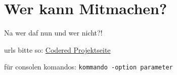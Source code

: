 \chapter{Wer kann Mitmachen?}  %
\label{chapter:Wer kann Mitmachen?}  %

Na wer daf nun und wer nicht?!

urls bitte so:
\href{http://codered.berlios.de}{Codered Projektseite}


für consolen komandos:
\verb|kommando -option parameter|

